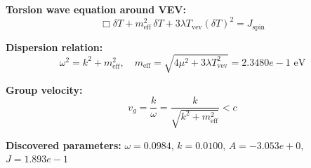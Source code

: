 
\textbf{Torsion wave equation around VEV:}
\begin{equation}
  \Box \delta T + m_{\text{eff}}^2 \, \delta T + 3\lambda T_{\text{vev}} (\delta T)^2 = J_{\text{spin}}
\end{equation}

\textbf{Dispersion relation:}
\begin{equation}
  \omega^2 = k^2 + m_{\text{eff}}^2, \quad
  m_{\text{eff}} = \sqrt{4\mu^2 + 3\lambda T_{\text{vev}}^2} = 2.3480e-1 \text{ eV}
\end{equation}

\textbf{Group velocity:}
\begin{equation}
  v_g = \frac{k}{\omega} = \frac{k}{\sqrt{k^2 + m_{\text{eff}}^2}} < c
\end{equation}

\textbf{Discovered parameters:}
$\omega = 0.0984$, \quad
$k = 0.0100$, \quad
$A = -3.053e+0$, \quad
$J = 1.893e-1$